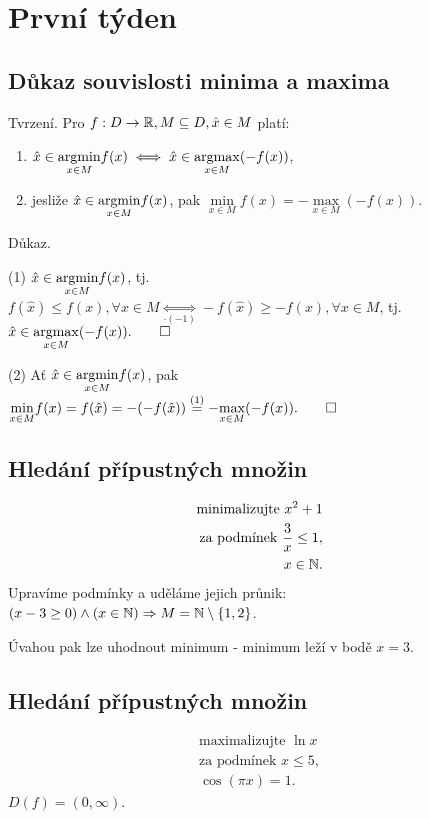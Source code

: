 \section{První týden}

\subsection{Důkaz souvislosti minima a maxima}

Tvrzení. Pro $f: D \rightarrow \mathbb{R}, M \subseteq D, \hat{x} \in M$ platí:

\begin{enumerate}[(1)]
    \item $\hat{x} \in \underset{x \in M}{\operatorname*{argmin}} f(x) \iff \hat{x} \in \underset{x \in M}{\operatorname*{argmax}} (-f(x))$,
    \item jesliže $\hat{x} \in \underset{x \in M}{\operatorname*{argmin}} f(x)$, pak $\underset{x \in M}{\min} f(x) =
    - \underset{x \in M}{\max} (-f(x))$.
\end{enumerate}
Důkaz.

(1) $\hat{x} \in \underset{x \in M}{\operatorname*{argmin}} f(x)$, tj. $f(\hat{x}) \leq f(x), \forall x \in M \underset{\cdot (-1)}{\iff}
-f(\hat{x}) \geq -f(x), \forall x \in M$, tj. $\hat{x} \in \underset{x \in M}{\operatorname*{argmax}} (-f(x)). \qed$


(2) Ať $\hat{x} \in \underset{x \in M}{\operatorname*{argmin}} f(x)$, pak $\underset{x \in M}{\min} f(x) = f(\hat{x}) =
- (- f(\hat{x})) \overset{(1)}{=} - \underset{x \in M}{\max} (-f(x)). \qed$

\subsection{Hledání přípustných množin}
\begin{align*}
    \text{minimalizujte } x^2 + 1 \\
    \text{za podmínek } \frac{3}{x} \leq 1, \\
    x \in \mathbb{N}.
\end{align*}
Upravíme podmínky a uděláme jejich průnik: $(x - 3 \geq 0) \land (x \in \mathbb{N}) \Rightarrow M = \mathbb{N} \setminus \left\lbrace 1,2 \right\rbrace$.

Úvahou pak lze uhodnout minimum - minimum leží v bodě $x=3$.

\subsection{Hledání přípustných množin}
\begin{align*}
    \text{maximalizujte } \ln x \\
    \text{za podmínek } x \leq 5, \\
    \cos(\pi x) = 1.
\end{align*}
$D(f) = (0, \infty)$.


